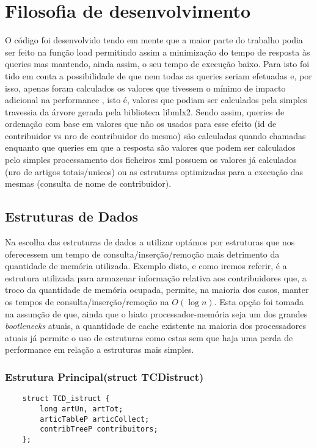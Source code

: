 \documentclass{report}
\begin{document}
\section{Filosofia de desenvolvimento}
O código foi desenvolvido tendo em mente que a maior parte do trabalho podia ser feito na função load permitindo assim a minimização do tempo de resposta às queries mas mantendo, ainda assim, o seu tempo de execução baixo. Para isto foi tido em conta a possibilidade de que nem todas as queries seriam efetuadas e, por isso, apenas foram calculados os valores que tivessem o mínimo de impacto adicional na performance , isto é, valores que podiam ser calculados pela simples travessia da árvore gerada pela biblioteca libmlx2. Sendo assim, queries de ordenação com base em valores que não os usados para esse efeito (id de contribuidor vs nro de contribuidor do mesmo) são calculadas quando chamadas enquanto que queries em que a resposta são valores que podem ser calculados pelo simples processamento dos ficheiros xml possuem os valores já calculados (nro de artigos totais/unicos) ou as estruturas optimizadas para a execução das mesmas (consulta de nome de contribuidor).

\subsection{Estruturas de Dados}
Na escolha das estruturas de dados a utilizar optámos por estruturas que nos oferecessem um tempo de consulta/inserção/remoção mais detrimento da quantidade de memória utilizada. Exemplo disto, e como iremos referir, é a estrutura utilizada para armazenar informação relativa aos contribuidores que, a troco da quantidade de memória ocupada, permite, na maioria dos casos, manter os tempos de consulta/inserção/remoção na $O(\log{}n)$. Esta opção foi tomada na assunção de que, ainda que o hiato processador-memória seja um dos grandes \textit{bootlenecks} atuais, a quantidade de cache existente na maioria dos processadores atuais já permite o uso de estruturas como estas sem que haja uma perda de performance em relação a estruturas mais simples.

\subsubsection{Estrutura Principal(struct TCDistruct)}

\begin{verbatim}
    struct TCD_istruct {
        long artUn, artTot;
        articTableP articCollect;
        contribTreeP contribuitors;
    };
\end{verbatim}
\end{document}
